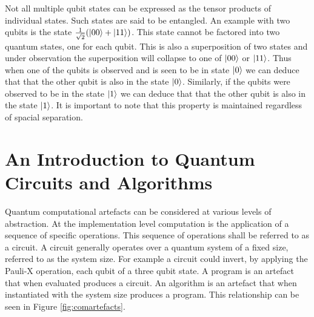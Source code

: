 
Not all multiple qubit states can be expressed as the tensor products of individual states.
Such states are said to be entangled.
An example with two qubits is the state $\frac{1}{\sqrt{2}}(\left\vert{00}\right\rangle+\left\vert{11}\right\rangle)$.
This state cannot be factored into two quantum states, one for each qubit.
This is also a superposition of two states and under observation the superposition will collapse to one of $\left\vert{00}\right\rangle$ or $\left\vert{11}\right\rangle$.
Thus when one of the qubits is observed and is seen to be in state $\left\vert{0}\right\rangle$ we can deduce that that the other qubit is also in the state $\left\vert{0}\right\rangle$.
Similarly, if the qubits were observed to be in the state $\left\vert{1}\right\rangle$ we can deduce that that the other qubit is also in the state $\left\vert{1}\right\rangle$.
It is important to note that this property is maintained regardless of spacial separation.


\section{An Introduction to Quantum Circuits and Algorithms}

Quantum computational artefacts can be considered at various levels of abstraction.
At the implementation level computation is the application of a sequence of specific operations.
This sequence of operations shall be referred to as a circuit.
A circuit generally operates over a quantum system of a fixed size, referred to as the system size.
For example a circuit could invert, by applying the Pauli-X operation, each qubit of a three qubit state.
A program is an artefact that when evaluated produces a circuit.
An algorithm is an artefact that when instantiated with the system size produces a program.
This relationship can be seen in Figure \ref{fig:comartefacts}.

